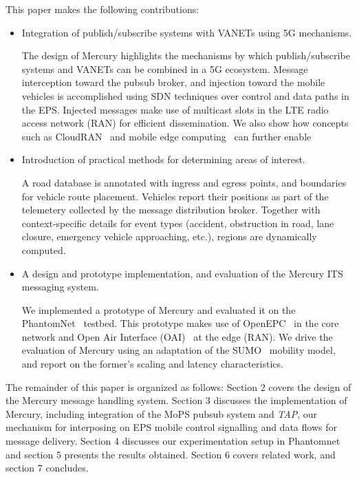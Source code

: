 This paper makes the following contributions:
\begin{itemize}

\item Integration of publish/subscribe systems with VANETs using 5G mechanisms.

The design of Mercury highlights the mechanisms by which
publish/subscribe systems and VANETs can be combined in a 5G
ecosystem. Message interception toward the pubsub broker, and
injection toward the mobile vehicles is accomplished using SDN
techniques over control and data paths in the EPS. Injected messages
make use of multicast slots in the LTE radio access network (RAN) for
efficient dissemination.  We also show how concepts such as
CloudRAN~\cite{cloudran} and mobile edge computing~\cite{mobile-edge}
can further enable

\item Introduction of practical methods for determining areas of interest.

A road database is annotated with ingress and egress points, and
boundaries for vehicle route placement.  Vehicles report their
positions as part of the telemetery collected by the message
distribution broker.  Together with context-specific details for event
types (accident, obstruction in road, lane closure, emergency vehicle
approaching, etc.), regions are dynamically computed.

\item A design and prototype implementation, and evaluation of the
  Mercury ITS messaging system.

We implemented a prototype of Mercury and evaluated it on the
PhantomNet~\cite{pnet} testbed.  This prototype makes use of
OpenEPC~\cite{OpenEPC} in the core network and Open Air Interface
(OAI)~\cite{OAI} at the edge (RAN).  We drive the evaluation of Mercury
using an adaptation of the SUMO~\cite{SUMO} mobility model, and
report on the former's scaling and latency characteristics.

\end{itemize}

The remainder of this paper is organized as follows: Section 2 covers
the design of the Mercury message handling system.  Section 3
discusses the implementation of Mercury, including integration of the
MoPS pubsub system and \emph{TAP}, our mechanism for interposing on
EPS mobile control signalling and data flows for message delivery.
Section 4 discusses our experimentation setup in Phantomnet and
section 5 presents the results obtained.  Section 6 covers related
work, and section 7 concludes.
